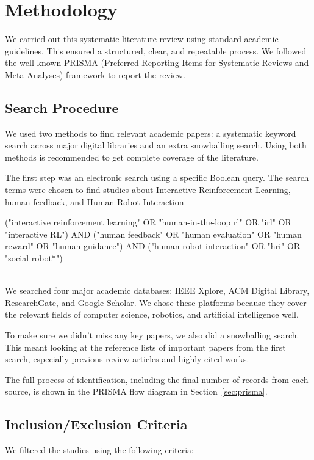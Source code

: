\documentclass[rnd]{mas_proposal}
\begin{document}
\section{Methodology}
\label{sec:methodology}
We carried out this systematic literature review using standard academic guidelines. This ensured a structured, clear, and repeatable process. We followed the well-known PRISMA (Preferred Reporting Items for Systematic Reviews and Meta-Analyses) framework to report the review.

\subsection{Search Procedure}
We used two methods to find relevant academic papers: a systematic keyword search across major digital libraries and an extra snowballing search. Using both methods is recommended to get complete coverage of the literature.

The first step was an electronic search using a specific Boolean query. The search terms were chosen to find studies about Interactive Reinforcement Learning, human feedback, and Human-Robot Interaction
\begin{paragraph}
("interactive reinforcement learning" OR "human-in-the-loop rl" OR "irl" OR "interactive RL") 
AND 
("human feedback" OR "human evaluation" OR "human reward" OR "human guidance") 
AND 
("human-robot interaction" OR "hri" OR "social robot*")  
\end{paragraph} \\

We searched four major academic databases: IEEE Xplore, ACM Digital Library, ResearchGate, and Google Scholar. We chose these platforms because they cover the relevant fields of computer science, robotics, and artificial intelligence well.

To make sure we didn't miss any key papers, we also did a snowballing search. This meant looking at the reference lists of important papers from the first search, especially previous review articles and highly cited works.

The full process of identification, including the final number of records from each source, is shown in the PRISMA flow diagram in Section~\ref{sec:prisma}.

\subsection{Inclusion/Exclusion Criteria}
We filtered the studies using the following criteria:
\end{document}
